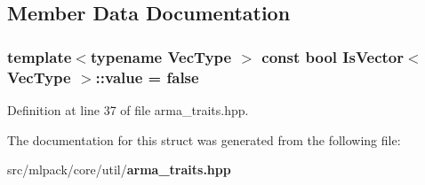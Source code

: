 \subsection{Member Data Documentation}
\subsubsection[{value}]{\setlength{\rightskip}{0pt plus 5cm}template$<$typename Vec\+Type $>$ const bool {\bf Is\+Vector}$<$ Vec\+Type $>$\+::value = false\hspace{0.3cm}{\ttfamily [static]}}\label{structIsVector_a5ec0c1366b298b7200906b0772831f45}


Definition at line 37 of file arma\+\_\+traits.\+hpp.



The documentation for this struct was generated from the following file\+:\begin{DoxyCompactItemize}
\item 
src/mlpack/core/util/{\bf arma\+\_\+traits.\+hpp}\end{DoxyCompactItemize}

